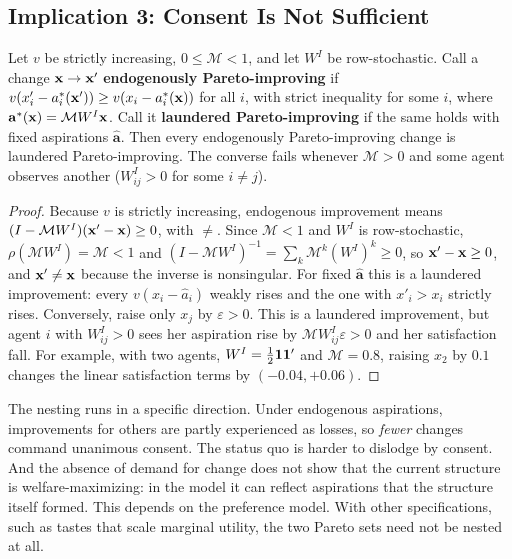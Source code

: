 \documentclass[../structural_economics_book.tex]{subfiles}
\begin{document}
\subsection{Implication 3: Consent Is Not Sufficient}

\begin{proposition}\label{ch12:prop:consent}
Let $v$ be strictly increasing, $0 \le \mathcal{M} < 1$, and let $W^I$ be row-stochastic. Call a change $\mathbf{x} \to \mathbf{x}'$ \textbf{endogenously Pareto-improving} if $v(x'_i - a_i^*(\mathbf{x}')) \ge v(x_i - a_i^*(\mathbf{x}))$ for all $i$, with strict inequality for some $i$, where $\mathbf{a}^*(\mathbf{x}) = \mathcal{M}W^I\mathbf{x}$. Call it \textbf{laundered Pareto-improving} if the same holds with fixed aspirations $\hat{\mathbf{a}}$. Then every endogenously Pareto-improving change is laundered Pareto-improving. The converse fails whenever $\mathcal{M} > 0$ and some agent observes another ($W^I_{ij} > 0$ for some $i \neq j$).
\end{proposition}

\begin{proof}
Because $v$ is strictly increasing, endogenous improvement means $(I - \mathcal{M}W^I)(\mathbf{x}' - \mathbf{x}) \ge 0$, with $\neq$. Since $\mathcal{M} < 1$ and $W^I$ is row-stochastic, $\rho(\mathcal{M}W^I) = \mathcal{M} < 1$ and $(I - \mathcal{M}W^I)^{-1} = \sum_k \mathcal{M}^k(W^I)^k \ge 0$, so $\mathbf{x}' - \mathbf{x} \ge 0$, and $\mathbf{x}' \neq \mathbf{x}$ because the inverse is nonsingular. For fixed $\hat{\mathbf{a}}$ this is a laundered improvement: every $v(x_i - \hat{a}_i)$ weakly rises and the one with $x'_i > x_i$ strictly rises. Conversely, raise only $x_j$ by $\varepsilon > 0$. This is a laundered improvement, but agent $i$ with $W^I_{ij} > 0$ sees her aspiration rise by $\mathcal{M}W^I_{ij}\varepsilon > 0$ and her satisfaction fall. For example, with two agents, $W^I = \frac12\mathbf{1}\mathbf{1}'$ and $\mathcal{M} = 0.8$, raising $x_2$ by $0.1$ changes the linear satisfaction terms by $(-0.04, +0.06)$.
\end{proof}

The nesting runs in a specific direction. Under endogenous aspirations, improvements for others are partly experienced as losses, so \textit{fewer} changes command unanimous consent. The status quo is harder to dislodge by consent. And the absence of demand for change does not show that the current structure is welfare-maximizing: in the model it can reflect aspirations that the structure itself formed. This depends on the preference model. With other specifications, such as tastes that scale marginal utility, the two Pareto sets need not be nested at all.
\end{document}
